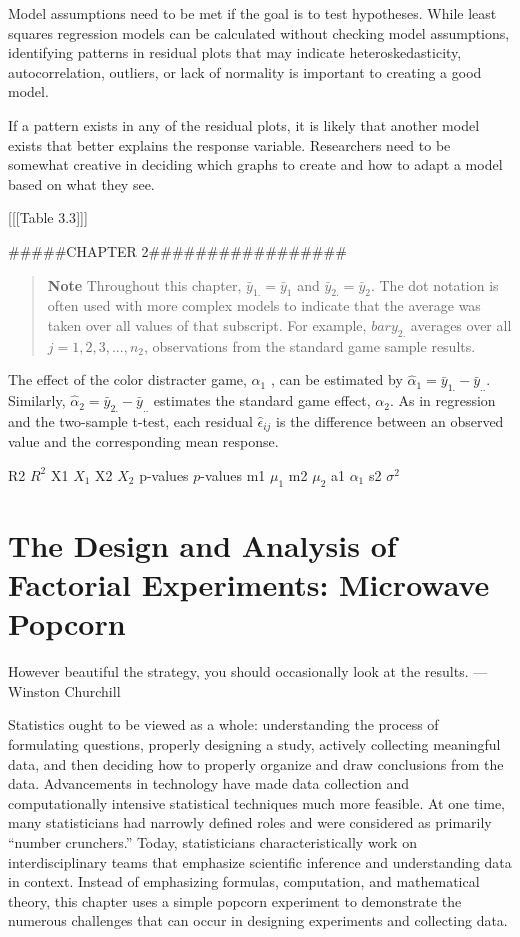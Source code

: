 \documentclass[
]{report}
\theoremstyle{definition}
\theoremstyle{definition}
\theoremstyle{definition}
\theoremstyle{definition}
\theoremstyle{remark}
\begin{document}
Model assumptions need to be met if the goal is to test hypotheses. While least squares regression models can be calculated without checking model assumptions, identifying patterns in residual plots that may indicate heteroskedasticity, autocorrelation, outliers, or lack of normality is important to creating a good model.

If a pattern exists in any of the residual plots, it is likely that another model exists that better explains the response variable. Researchers need to be somewhat creative in deciding which graphs to create and how to adapt a model based on what they see.

{[}{[}{[}Table 3.3{]}{]}{]}

\#\#\#\#\#CHAPTER 2\#\#\#\#\#\#\#\#\#\#\#\#\#\#\#\#\#

\begin{quote}
\textbf{Note}
Throughout this chapter, \(\bar{y}_{1.} = \bar{y}_{1}\) and \(\bar{y}_{2.} = \bar{y}_{2}\). The dot notation is often used with more complex models
to indicate that the average was taken over all values of that subscript. For example, \(bar{y}_{2.}\) averages over all
\(j = 1, 2, 3, ... , n_2\), observations from the standard game sample results.
\end{quote}

The effect of the color distracter game, \(\alpha_1\) , can be estimated by \(\hat{\alpha}_1 = \bar{y}_{1.} - \bar{y}_{..}\). Similarly, \(\hat{\alpha}_2 = \bar{y}_{2.} - \bar{y}_{..}\)
estimates the standard game effect, \(\alpha_2\). As in regression and the two-sample t-test, each residual \(\hat{\epsilon}_{ij}\) is the
difference between an observed value and the corresponding mean response.

R2 \(R^2\)
X1 \(X_1\)
X2 \(X_2\)
p-values \(p\)-values
m1 \(\mu_1\)
m2 \(\mu_2\)
a1 \(\alpha_1\)
s2 \(\sigma^2\)

\hypertarget{the-design-and-analysis-of-factorial-experiments-microwave-popcorn}{%
\chapter{The Design and Analysis of Factorial Experiments: Microwave Popcorn}\label{the-design-and-analysis-of-factorial-experiments-microwave-popcorn}}

However beautiful the strategy, you should occasionally
look at the results.
--- Winston Churchill

Statistics ought to be viewed as a whole: understanding the process of formulating questions, properly designing a study, actively collecting meaningful data, and then deciding
how to properly organize and draw conclusions from the data. Advancements in technology have made data collection and computationally intensive statistical techniques much more
feasible. At one time, many statisticians had narrowly defined roles and were considered as
primarily ``number crunchers.'' Today, statisticians characteristically work on interdisciplinary
teams that emphasize scientific inference and understanding data in context.
Instead of emphasizing formulas, computation, and mathematical theory, this chapter
uses a simple popcorn experiment to demonstrate the numerous challenges that can occur in
designing experiments and collecting data.
\end{document}
